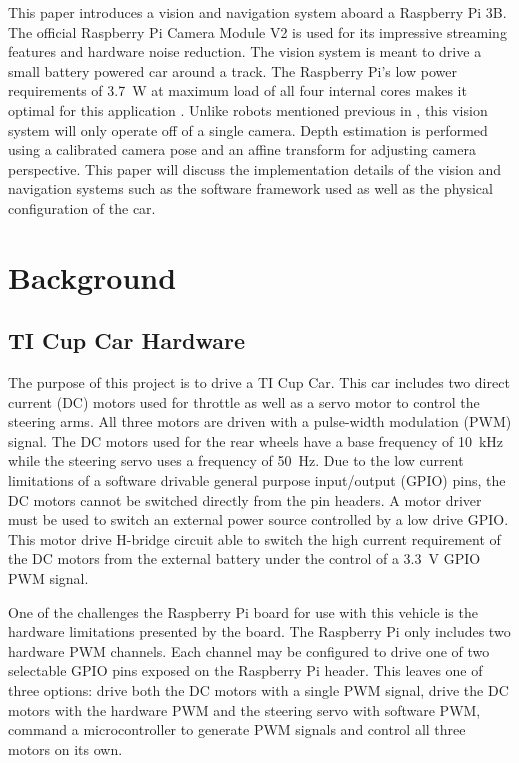 \documentclass{article}
\begin{document}
This paper introduces a vision and navigation system aboard a Raspberry Pi 3B. The official
Raspberry Pi Camera Module V2 is used for its impressive streaming features and hardware
noise reduction. The vision system is meant to drive a small battery powered car around
a track. The Raspberry Pi's low power requirements of \SI{3.7}{\watt} at maximum load
of all four internal cores makes it optimal for this application \cite{b2}. Unlike
robots mentioned previous in \cite{b1}, this vision system will only operate off of
a single camera. Depth estimation is performed using a calibrated camera pose and an
affine transform for adjusting camera perspective. This paper will discuss the
implementation details of the vision and navigation systems such as the software framework
used as well as the physical configuration of the car. 

\section{Background}

\subsection{TI Cup Car Hardware}

The purpose of this project is to drive a TI Cup Car. This car includes two direct current
(DC) motors used for throttle as well as a servo motor to control the steering arms.
All three motors are driven with a pulse-width modulation (PWM) signal. The DC motors
used for the rear wheels have a base frequency of \SI{10}{\kilo\hertz} while the steering
servo uses a frequency of \SI{50}{\hertz}. Due to the low current limitations of a software
drivable general purpose input/output (GPIO) pins, the DC motors cannot be switched directly
from the pin headers. A motor driver must be used to switch an external power source
controlled by a low drive GPIO. This motor drive H-bridge circuit able to
switch the high current requirement of the DC motors from the external battery under the
control of a \SI{3.3}{\volt} GPIO PWM signal.

One of the challenges the Raspberry Pi board for use with this vehicle is the hardware
limitations presented by the board. The Raspberry Pi only includes two hardware PWM
channels. Each channel may be configured to drive one of two selectable GPIO pins
exposed on the Raspberry Pi header. This leaves one of three options: drive both the
DC motors with a single PWM signal, drive the DC motors with the hardware PWM and the
steering servo with software PWM, command a microcontroller to generate PWM signals
and control all three motors on its own.
\end{document}
